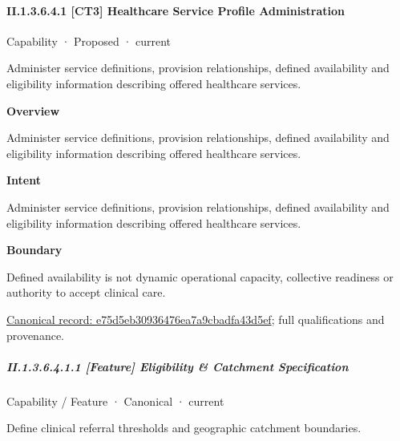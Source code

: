 \paragraph*{II.1.3.6.4.1 [CT3] Healthcare Service Profile Administration}
\label{navigation:II.1.3.6.4.1}

\label{element:e75d5eb30936476ea7a9cbadfa43d5ef}
{\small Capability · Proposed · current}\par

Administer service definitions, provision relationships, defined availability and eligibility information describing offered healthcare services.



\textbf{Overview}



Administer service definitions, provision relationships, defined availability and eligibility information describing offered healthcare services.



\textbf{Intent}



Administer service definitions, provision relationships, defined availability and eligibility information describing offered healthcare services.



\textbf{Boundary}



Defined availability is not dynamic operational capacity, collective readiness or authority to accept clinical care.


{\footnotesize \href{../../../../continuum/strategy/capability/e75d5eb30936476ea7a9cbadfa43d5ef.md}{Canonical record: e75d5eb30936476ea7a9cbadfa43d5ef}; full qualifications and provenance.}\par
\subparagraph*{II.1.3.6.4.1.1 [Feature] Eligibility \& Catchment Specification}
\label{navigation:II.1.3.6.4.1.1}

\label{element:c65feabade3d47c39e7d7af9bc16ebdc}
{\small Capability / Feature · Canonical · current}\par

Define clinical referral thresholds and geographic catchment boundaries.



